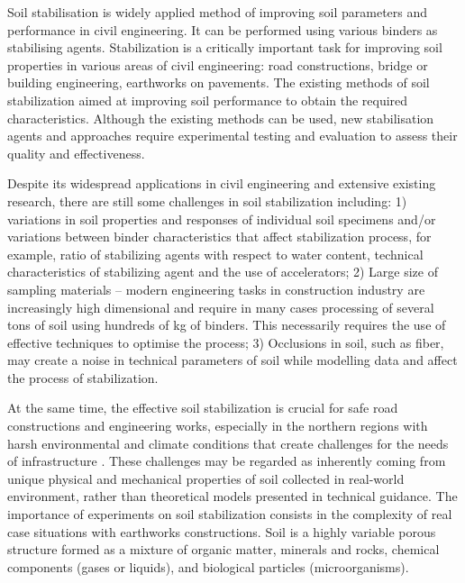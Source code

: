 \documentclass[eprint,
]{actapoly}
\begin{document}
Soil stabilisation is widely applied method of improving soil parameters and performance in civil engineering. It can be performed using various binders as stabilising agents. Stabilization is a critically important task for improving soil properties in various areas of civil engineering: road constructions, bridge or building engineering, earthworks on pavements. The existing methods of soil stabilization aimed at improving soil performance to obtain the required characteristics. Although the existing methods can be used, new stabilisation agents and approaches require experimental testing and evaluation to assess their quality and effectiveness. 

Despite its widespread applications in civil engineering and extensive existing research, there are still some challenges in soil stabilization including: 1) variations in soil properties and responses of individual soil specimens and/or variations between binder characteristics that affect stabilization process, for example, ratio of stabilizing agents with respect to water content, technical characteristics of stabilizing agent and the use of accelerators; 2) Large size of sampling materials – modern engineering tasks in construction industry are increasingly high dimensional and require in many cases processing of several tons of soil using hundreds of kg of binders. This necessarily requires the use of effective techniques to optimise the process; 3) Occlusions in soil, such as fiber, may create a noise in technical parameters of soil while modelling data and affect the process of stabilization. 

At the same time, the effective soil stabilization is crucial for safe road constructions and engineering works, especially in the northern regions with harsh environmental and climate conditions that create challenges for the needs of infrastructure \citep{Dahlinetal1999,ROTHHAMEL2022100735,Lindh2004,VESTIN2018146,Lemenkov2021a,Lemenkov2021b,Eigenbrod}. These challenges may be regarded as inherently coming from unique physical and mechanical properties of soil collected in real-world environment, rather than theoretical models presented in technical guidance. The importance of experiments on soil stabilization consists in the complexity of real case situations with earthworks constructions. Soil is a highly variable porous structure formed as a mixture of organic matter, minerals and rocks, chemical components (gases or liquids), and biological particles (microorganisms). 
\end{document}
